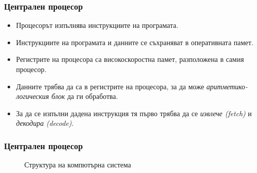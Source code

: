 \documentclass[ignorenonframetext, hyperref=unicode]{beamer}
\begin{document}
\begin{frame}
\frametitle{Централен процесор}
\begin{itemize}
\item Процесорът изпълнява инструкциите на програмата.
\item Инструкциите на програмата и данните се съхраняват в оперативната памет.
\item Регистрите на процесора са високоскоростна памет, разположена в самия
процесор. 
\item Данните трябва да са в регистрите на процесора, за да може
{\em аритметико-логическия блок} да ги обработва. 
\item За да се изпълни дадена инструкция тя първо трябва да се {\em извлече (fetch)} и
{\em декодира (decode)}.
\end{itemize}
\end{frame}

\begin{frame}
\frametitle{Централен процесор}
\begin{figure}[h]
\center
{}
\caption{Структура на компютърна система}
\end{figure}
\end{frame}
\end{document}
